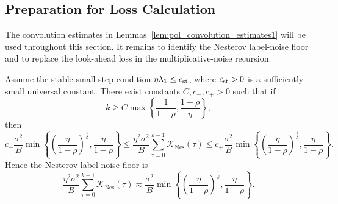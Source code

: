 \subsection{Preparation for Loss Calculation}
\label{app:nes_preparation}

The convolution estimates in Lemmas~\ref{lem:pol_convolution_estimates1} will be used throughout this section. It remains to identify the Nesterov label-noise floor and to replace the look-ahead loss in the multiplicative-noise recursion.

\begin{lemma}
\label{lem:nes_label_noise}
Assume the stable small-step condition \(\eta\lambda_1\le c_{\rm st}\), where \(c_{\rm st}>0\) is a
sufficiently small universal constant.  There exist constants \(C,c_-,c_+>0\) such that if
\[
    k\ge
    C\max\left\{\frac1{1-\rho},\frac{1-\rho}{\eta}\right\},
\]
then
\[
    c_-\frac{\sigma^2}{B}
    \min\left\{
        \left(\frac{\eta}{1-\rho}\right)^{\frac1\beta},
        \frac{\eta}{1-\rho}
    \right\}
    \le
    \frac{\eta^2\sigma^2}{B}\sum_{\tau=0}^{k-1}\mathcal K_{\mathrm{Nes}}(\tau)
    \le
    c_+\frac{\sigma^2}{B}
    \min\left\{
        \left(\frac{\eta}{1-\rho}\right)^{\frac1\beta},
        \frac{\eta}{1-\rho}
    \right\}.
\]
Hence the Nesterov label-noise floor is
\[
    \frac{\eta^2\sigma^2}{B}\sum_{\tau=0}^{k-1}\mathcal K_{\mathrm{Nes}}(\tau)
    \eqsim
    \frac{\sigma^2}{B}
    \min\left\{
        \left(\frac{\eta}{1-\rho}\right)^{\frac1\beta},
        \frac{\eta}{1-\rho}
    \right\}.
\]
\end{lemma}

